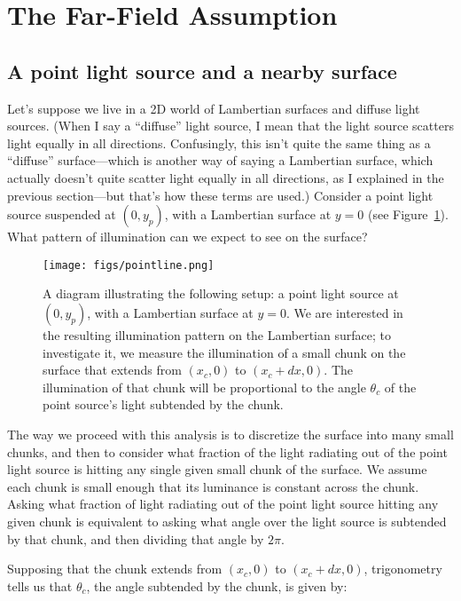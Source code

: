 \section{The Far-Field Assumption}

\subsection{A point light source and a nearby surface}

    Let's suppose we live in a 2D world of Lambertian surfaces and diffuse light sources. (When I say a ``diffuse'' light source, I mean that the light source scatters light equally in all directions. Confusingly, this isn't quite the same thing as a ``diffuse'' surface---which is another way of saying a Lambertian surface, which actually doesn't quite scatter light equally in all directions, as I explained in the previous section---but that's how these terms are used.) Consider a point light source suspended at $(0, y_p)$, with a Lambertian surface at $y=0$ (see Figure~\ref{fig:pointline}). What pattern of illumination can we expect to see on the surface?

\begin{figure}
\begin{center}
\texttt{[image: figs/pointline.png]}
\caption{A diagram illustrating the following setup: a point light source at $(0, y_p)$, with a Lambertian surface at $y=0$. We are interested in the resulting illumination pattern on the Lambertian surface; to investigate it, we measure the illumination of a small chunk on the surface that extends from $(x_c, 0)$ to $(x_c + dx, 0)$. The illumination of that chunk will be proportional to the angle $\theta_c$ of the point source's light subtended by the chunk. \label{fig:pointline}}
\end{center}
\end{figure}
    
    The way we proceed with this analysis is to discretize the surface into many small chunks, and then to consider what fraction of the light radiating out of the point light source is hitting any single given small chunk of the surface. We assume each chunk is small enough that its luminance is constant across the chunk. Asking what fraction of light radiating out of the point light source hitting any given  chunk is equivalent to asking what angle over the light source is subtended by that chunk, and then dividing that angle by $2\pi$. 
    
    Supposing that the chunk extends from $(x_c, 0)$ to $(x_c + dx, 0)$, trigonometry tells us that $\theta_c$, the angle subtended by the chunk, is given by:
    
